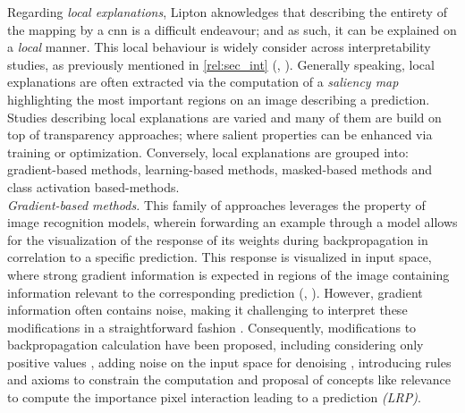 Regarding \emph{local explanations}, Lipton aknowledges that describing the entirety of the 
mapping by a \gls{cnn} is a difficult endeavour; and as such, it can be explained on a 
\emph{local} manner. This local behaviour is widely consider across interpretability studies, as 
previously mentioned in \autoref{rel:sec_int} (\cite{guidotti2018survey}, \cite{zhang2021survey}). 
Generally speaking, local explanations are often extracted via the computation of a \emph{saliency 
map} highlighting the most important regions on an image describing a prediction. Studies describing 
local explanations are varied and many of them are build on top of transparency approaches; where 
salient properties can be enhanced via training or optimization. Conversely, local explanations 
are grouped into: gradient-based methods, learning-based methods, masked-based methods and 
class activation based-methods.\\

\noindent \emph{Gradient-based methods.} This family of approaches leverages the property of 
image recognition models, wherein forwarding an example through a model allows for the 
visualization of the response of its weights during backpropagation in correlation to a specific 
prediction. This response is visualized in input space, where strong gradient information is 
expected in regions of the image containing information relevant to the corresponding prediction 
(\cite{baehrens2010explain}, \cite{simonyan2013deep}). However, gradient information often contains 
noise, making it challenging to interpret these modifications in a straightforward fashion 
\cite{adebayo2018local}. Consequently, modifications to backpropagation calculation have 
been proposed, including considering only positive values \autocite{guidedbackprop}, adding noise 
on the input space for denoising \autocite{smilkov2017smoothgrad}, introducing rules and axioms to 
constrain the computation \autocite{sundararajan2017axiomatic} and proposal of concepts like 
relevance \autocite{bach2015pixel} to compute the importance pixel interaction leading to a 
prediction \emph{(LRP)}.\\

